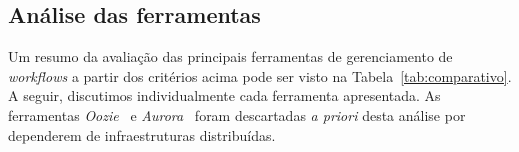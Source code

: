 \begin{table}
\caption{Comparativo entre ferramentas de gerenciamento de \textit{workflow} segundo critérios de adequação ao TRE-RN.}\label{tab:comparativo}
\end{table}

\subsection{Análise das ferramentas}

Um resumo da avaliação das principais ferramentas de gerenciamento de \textit{workflows} a partir dos critérios acima pode ser visto na Tabela~\ref{tab:comparativo}. A seguir, discutimos individualmente cada ferramenta apresentada. As ferramentas \textit{Oozie}~\cite{ooziewebsite} e \textit{Aurora}~\cite{aurorawebsite} foram descartadas \textit{a priori} desta análise por dependerem de infraestruturas distribuídas.




